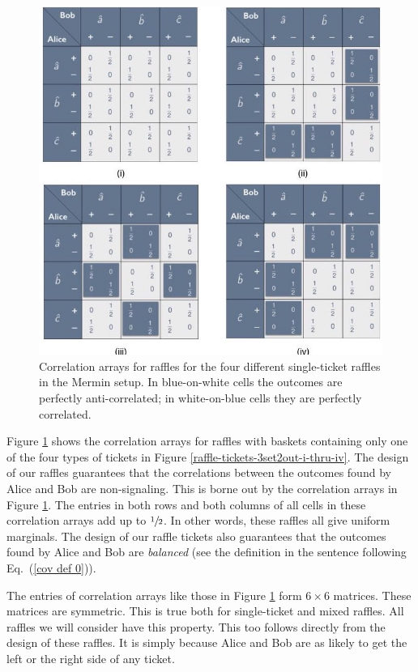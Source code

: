 \begin{figure}[h]   
 \centering
   \includegraphics[width=4.5in]{CA-3set2out-raffles-i-thru-iv.jpeg} 
   \caption{Correlation arrays for raffles for the four different single-ticket raffles in the Mermin setup. In blue-on-white cells the outcomes are perfectly anti-correlated; in white-on-blue cells they are perfectly correlated.}
   \label{CA-3set2out-raffles-i-thru-iv}
\end{figure}

Figure \ref{CA-3set2out-raffles-i-thru-iv} shows the correlation arrays for raffles with baskets containing only one of the four types of tickets in Figure \ref{raffle-tickets-3set2out-i-thru-iv}. The design of our raffles guarantees that the correlations between the outcomes found by Alice and Bob are non-signaling. This is borne out by the correlation arrays in Figure \ref{CA-3set2out-raffles-i-thru-iv}. The entries in both rows and both columns of all cells in these correlation arrays add up to $\sfrac12$. In other words, these raffles all give uniform marginals. The design of our raffle tickets also guarantees that the outcomes found by Alice and Bob are \emph{balanced} (see the definition in the sentence following  Eq.\ (\ref{cov def 0})).

The entries of correlation arrays like those in Figure \ref{CA-3set2out-raffles-i-thru-iv} form $6 \times 6$ matrices. These matrices are symmetric. This is true both for single-ticket and mixed raffles. All raffles we will consider have this property. This too follows directly from the design of these raffles. It is simply because Alice and Bob are as likely to get the left or the right side of any ticket. 

